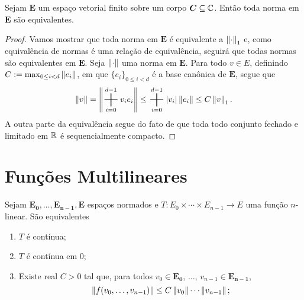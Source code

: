 \begin{prop}
Sejam $\bm E$ um espaço vetorial finito sobre um corpo $\bm C \subseteq \mathbb{C}$. Então toda norma em $\bm E$ são equivalentes.
\end{prop}
\begin{proof}
Vamos mostrar que toda norma em $\bm E$ é equivalente a $\left\Vert{\cdot}\right\Vert_1$ e, como equivalência de normas é uma relação de equivalência, seguirá que todas normas são equivalentes em $\bm E$. Seja $\left\Vert{\cdot}\right\Vert$ uma norma em $\bm E$. Para todo $v \in E$, definindo $C := \max_{0\leq i <d} \left\Vert{e_i}\right\Vert$, em que $\{e_i\}_{0 \leq i < d}$ é a base canônica de $\bm E$, segue que
	\begin{equation*}
	\nor{v} = \nor{\bigplus_{i=0}^{d-1} v_ie_i} \leq \bigplus_{i=0}^{d-1}\abs{v_i}\nor{e_i} \leq C\nor{v}_1.
	\end{equation*}
A outra parte da equivalência segue do fato de que toda todo conjunto fechado e limitado em $\mathbb{R}$ é sequencialmente compacto.
\end{proof}

\section{Funções Multilineares}

\begin{prop}
Sejam $\bm{E_0},\dots,\bm{E_{n-1}},\bm{E}$ espaços normados e $T: E_0 \times \cdots \times E_{n-1} \to E$ uma função $n$-linear. São equivalentes
	\begin{enumerate}
	\item $T$ é contínua;
	\item $T$ é contínua em $0$;
	\item Existe real $C>0$ tal que, para todos $v_0 \in \bm{E_0}$, $\ldots$, $v_{n-1} \in \bm{E_{n-1}}$,
		\begin{equation*}
		\left\Vert{f(v_0,\dots,v_{n-1})}\right\Vert \leq C\left\Vert{v_0}\right\Vert\cdots\left\Vert{v_{n-1}}\right\Vert;
		\end{equation*}	
	\end{enumerate}
\end{prop}

